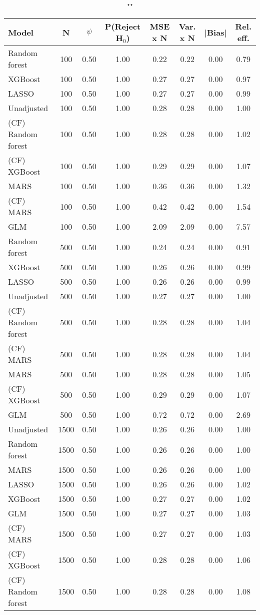 \begin{table}
\centering
\caption{""}
\begin{tabular}{lccccccc}
\toprule
Model & N & $\psi$ & P(Reject H$_0$) & MSE x N & Var. x N & |Bias| & Rel. eff.\\ \midrule
Random forest & 100 & 0.50 & 1.00 & 0.22 & 0.22 & 0.00 & 0.79 \\ 
XGBoost & 100 & 0.50 & 1.00 & 0.27 & 0.27 & 0.00 & 0.97 \\ 
LASSO & 100 & 0.50 & 1.00 & 0.27 & 0.27 & 0.00 & 0.99 \\ 
Unadjusted & 100 & 0.50 & 1.00 & 0.28 & 0.28 & 0.00 & 1.00 \\ 
(CF) Random forest & 100 & 0.50 & 1.00 & 0.28 & 0.28 & 0.00 & 1.02 \\ 
(CF) XGBoost & 100 & 0.50 & 1.00 & 0.29 & 0.29 & 0.00 & 1.07 \\ 
MARS & 100 & 0.50 & 1.00 & 0.36 & 0.36 & 0.00 & 1.32 \\ 
(CF) MARS & 100 & 0.50 & 1.00 & 0.42 & 0.42 & 0.00 & 1.54 \\ 
GLM & 100 & 0.50 & 1.00 & 2.09 & 2.09 & 0.00 & 7.57 \\ \addlinespace 
Random forest & 500 & 0.50 & 1.00 & 0.24 & 0.24 & 0.00 & 0.91 \\ 
XGBoost & 500 & 0.50 & 1.00 & 0.26 & 0.26 & 0.00 & 0.99 \\ 
LASSO & 500 & 0.50 & 1.00 & 0.26 & 0.26 & 0.00 & 0.99 \\ 
Unadjusted & 500 & 0.50 & 1.00 & 0.27 & 0.27 & 0.00 & 1.00 \\ 
(CF) Random forest & 500 & 0.50 & 1.00 & 0.28 & 0.28 & 0.00 & 1.04 \\ 
(CF) MARS & 500 & 0.50 & 1.00 & 0.28 & 0.28 & 0.00 & 1.04 \\ 
MARS & 500 & 0.50 & 1.00 & 0.28 & 0.28 & 0.00 & 1.05 \\ 
(CF) XGBoost & 500 & 0.50 & 1.00 & 0.29 & 0.29 & 0.00 & 1.07 \\ 
GLM & 500 & 0.50 & 1.00 & 0.72 & 0.72 & 0.00 & 2.69 \\ \addlinespace 
Unadjusted & 1500 & 0.50 & 1.00 & 0.26 & 0.26 & 0.00 & 1.00 \\ 
Random forest & 1500 & 0.50 & 1.00 & 0.26 & 0.26 & 0.00 & 1.00 \\ 
MARS & 1500 & 0.50 & 1.00 & 0.26 & 0.26 & 0.00 & 1.00 \\ 
LASSO & 1500 & 0.50 & 1.00 & 0.26 & 0.26 & 0.00 & 1.02 \\ 
XGBoost & 1500 & 0.50 & 1.00 & 0.27 & 0.27 & 0.00 & 1.02 \\ 
GLM & 1500 & 0.50 & 1.00 & 0.27 & 0.27 & 0.00 & 1.03 \\ 
(CF) MARS & 1500 & 0.50 & 1.00 & 0.27 & 0.27 & 0.00 & 1.03 \\ 
(CF) XGBoost & 1500 & 0.50 & 1.00 & 0.28 & 0.28 & 0.00 & 1.06 \\ 
(CF) Random forest & 1500 & 0.50 & 1.00 & 0.28 & 0.28 & 0.00 & 1.08 \\
\bottomrule
\end{tabular}
\end{table}

